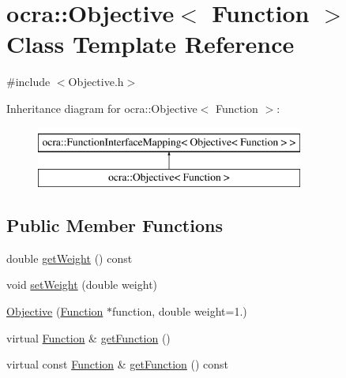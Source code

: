 \hypertarget{classocra_1_1Objective_3_01Function_01_4}{}\section{ocra\+:\+:Objective$<$ Function $>$ Class Template Reference}
\label{classocra_1_1Objective_3_01Function_01_4}


{\ttfamily \#include $<$Objective.\+h$>$}

Inheritance diagram for ocra\+:\+:Objective$<$ Function $>$\+:\begin{figure}[H]
\begin{center}
\leavevmode
\includegraphics[height=2.000000cm]{dc/dae/classocra_1_1Objective_3_01Function_01_4}
\end{center}
\end{figure}
\subsection*{Public Member Functions}
\begin{DoxyCompactItemize}
\item 
double \hyperlink{classocra_1_1Objective_3_01Function_01_4_ac952056842fb2d15b758eb5a0b342a30}{get\+Weight} () const
\item 
void \hyperlink{classocra_1_1Objective_3_01Function_01_4_a41fa85e1e535bb935f20312e7b398a26}{set\+Weight} (double weight)
\end{DoxyCompactItemize}
{\bf }\par
\begin{DoxyCompactItemize}
\item 
\hyperlink{classocra_1_1Objective_3_01Function_01_4_a5a469564d2691823b5e9e951c975b66c}{Objective} (\hyperlink{classocra_1_1Function}{Function} $\ast$function, double weight=1.)
\end{DoxyCompactItemize}

{\bf }\par
\begin{DoxyCompactItemize}
\item 
virtual \hyperlink{classocra_1_1Function}{Function} \& \hyperlink{classocra_1_1Objective_3_01Function_01_4_add81891f4afd477c85ddc326a207e8be}{get\+Function} ()
\item 
virtual const \hyperlink{classocra_1_1Function}{Function} \& \hyperlink{classocra_1_1Objective_3_01Function_01_4_a95077951a77304a73e345eb093513da0}{get\+Function} () const
\end{DoxyCompactItemize}

